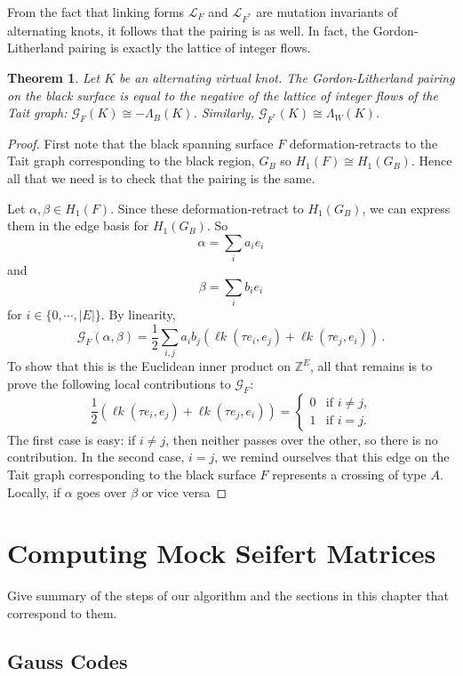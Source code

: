 \documentclass[12pt]{report}
\newcommand{\Z}{\mathbb{Z}}
\newcommand{\lk}{\operatorname{\ell\textit{k}}}
\newtheorem*{theorem}{Theorem}
\begin{document}
From the fact that linking forms $\mathcal{L}_{F}$ and $\mathcal{L}_{F^{*}}$ are mutation invariants of alternating knots, it follows that the pairing is as well. In fact, the Gordon-Litherland pairing is exactly the lattice of integer flows.

\begin{theorem}
Let $K$ be an alternating virtual knot. The Gordon-Litherland pairing on the black surface  is equal to the negative of the lattice of integer flows of the Tait graph: $\mathcal{G}_{F}(K) \cong -\Lambda_{B}(K)$. Similarly, $\mathcal{G}_{F^{*}}(K) \cong \Lambda_{W}(K)$.
\end{theorem}

\begin{proof}
First note that the black spanning surface $F$ deformation-retracts to the Tait graph corresponding to the black region, $G_{B}$ so $H_{1}(F) \cong H_{1}(G_{B})$. Hence all that we need is to check that the pairing is the same.

Let $\alpha, \beta \in H_{1}(F)$. Since these deformation-retract to $H_{1}(G_{B})$, we can express them in the edge basis for $H_{1}(G_{B})$. So
\[\alpha = \sum_{i} a_{i}e_{i}\]
and
\[\beta = \sum_{i} b_{i}e_{i}\]
for $i \in \{0, \cdots, |E|\}$.
By linearity,
\[\mathcal{G}_{F}(\alpha, \beta) = \dfrac{1}{2}\sum_{i, j} a_{i}b_{j}\left(\lk(\tau e_{i}, e_{j}) + \lk(\tau e_{j}, e_{i})\right)\,.\]
To show that this is the Euclidean inner product on $\Z^{E}$, all that remains is to prove the following local contributions to $\mathcal{G}_{F}$:
\[\dfrac{1}{2}(\lk(\tau e_{i}, e_{j}) + \lk(\tau e_{j}, e_{i})) = \begin{cases}
	0 & \text{if $i \neq j$,} \\
	1 & \text{if $i = j$}.
\end{cases}\]
The first case is easy: if $i \neq j$, then neither passes over the other, so there is no contribution. In the second case, $i = j$, we remind ourselves that this edge on the Tait graph corresponding to the black surface $F$ represents a crossing of type $A$. Locally, if $\alpha$ goes over $\beta$ or vice versa
\end{proof}

\chapter{Computing Mock Seifert Matrices}
Give summary of the steps of our algorithm and the sections in this chapter that correspond to them.

\section{Gauss Codes}
\end{document}
